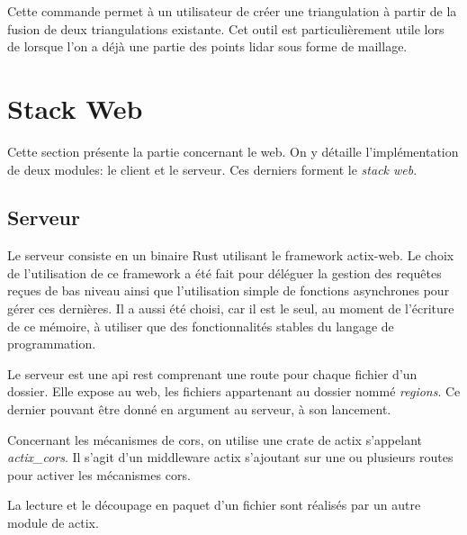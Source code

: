 Cette commande permet à un utilisateur de créer une triangulation à
partir de la fusion de deux triangulations existante. Cet outil est
particulièrement utile lors de lorsque l'on a déjà une partie des points lidar
sous forme de maillage.
\section{Stack Web}

Cette section présente la partie concernant le web. On y détaille l'implémentation
de deux modules: le client et le serveur.
Ces derniers forment le \textit{stack web}.

\subsection{Serveur}

Le serveur consiste en un binaire Rust utilisant le framework actix-web.
Le choix de l'utilisation de ce framework a été fait pour déléguer la gestion des
requêtes reçues de bas niveau ainsi que l'utilisation simple de fonctions
asynchrones pour gérer ces dernières.
Il a aussi été choisi, car il est le seul, au moment de l'écriture de ce mémoire,
à utiliser que des fonctionnalités stables du langage de programmation.

Le serveur est une \gls{api} \gls{rest} comprenant une route pour chaque fichier
d'un dossier.
Elle expose au web, les fichiers appartenant au dossier nommé \textit{regions}.
Ce dernier pouvant être donné en argument au serveur, à son lancement.

Concernant les mécanismes de \gls{cors}, on utilise une crate de actix
s'appelant \textit{actix\_cors}.
Il s'agit d'un middleware actix s'ajoutant sur une ou plusieurs routes pour
activer les mécanismes \gls{cors}.

La lecture et le découpage en paquet d'un fichier sont réalisés par un autre
module de actix.


